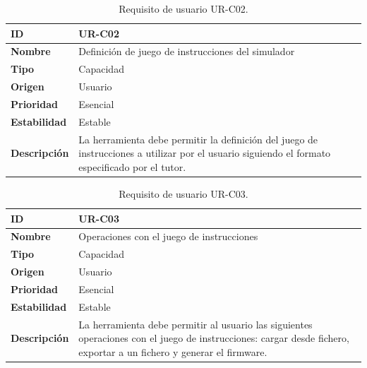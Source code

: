\begin{center}
\begin{table}[htbp]
\centering
\begin{tabular}{@{}p{2.5cm} p{9cm}@{}} 
\toprule
\textbf{ID} 				& UR-C02 \\
\midrule
\textbf{Nombre} 			& Definición de juego de instrucciones del simulador \\
\midrule
\textbf{Tipo} 			& Capacidad \\
\midrule
\textbf{Origen} 			& Usuario \\
\midrule
\textbf{Prioridad}		& Esencial \\
\midrule
\textbf{Estabilidad} 		& Estable \\
\midrule
\textbf{Descripción} 	& La herramienta debe permitir la definición del juego de instrucciones a utilizar por el usuario siguiendo el formato especificado por el tutor. \\
\bottomrule
\end{tabular}
\caption{Requisito de usuario UR-C02.}
\label{tab:urc02}
\end{table}
\end{center}

\begin{center}
\begin{table}[htbp]
\centering
\begin{tabular}{@{}p{2.5cm} p{9cm}@{}} 
\toprule
\textbf{ID} 				& UR-C03 \\
\midrule
\textbf{Nombre} 			& Operaciones con el juego de instrucciones \\
\midrule
\textbf{Tipo} 			& Capacidad \\
\midrule
\textbf{Origen} 			& Usuario \\
\midrule
\textbf{Prioridad}		& Esencial \\
\midrule
\textbf{Estabilidad} 		& Estable \\
\midrule
\textbf{Descripción} 	& La herramienta debe permitir al usuario las siguientes operaciones con el juego de instrucciones: cargar desde fichero, exportar a un fichero y generar el firmware. \\
\bottomrule
\end{tabular}
\caption{Requisito de usuario UR-C03.}
\label{tab:urc03}
\end{table}
\end{center}

